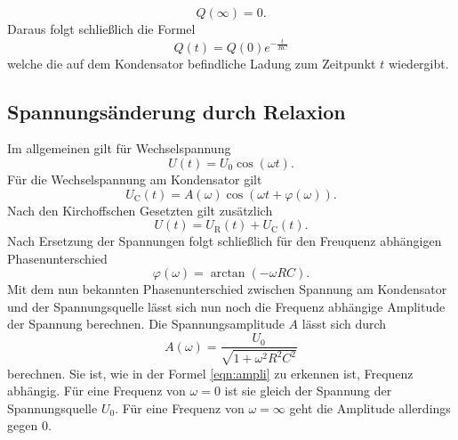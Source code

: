 \begin{equation*}
    Q(\infty) = 0.
\end{equation*}
Daraus folgt schließlich die Formel
\begin{equation}
    Q(t) = Q(0) e^{-\frac{t}{RC}}
    \label{eqn:ladungkondi}
\end{equation}
welche die auf dem Kondensator befindliche Ladung zum Zeitpunkt $t$ wiedergibt.

\subsection{Spannungsänderung durch Relaxion}
Im allgemeinen gilt für Wechselspannung 
\begin{equation}
    U(t) = U_0 \cos(\omega t).
\end{equation}
Für die Wechselspannung am Kondensator gilt 
\begin{equation}
    U_\text{C}(t) = A(\omega) \cos(\omega t + \varphi(\omega)).
\end{equation}
Nach den Kirchoffschen Gesetzten gilt zusätzlich
\begin{equation}
    U(t) = U_\text{R}(t) + U_\text{C}(t).
\end{equation}
Nach Ersetzung der Spannungen folgt schließlich für den Freuquenz abhängigen Phasenunterschied
\begin{equation}
    \varphi(\omega) = \arctan(-\omega RC).
    \label{eqn:phase}
\end{equation}
Mit dem nun bekannten Phasenunterschied zwischen Spannung am Kondensator und der Spannungsquelle lässt sich nun noch die Frequenz abhängige Amplitude der Spannung berechnen.
Die Spannungsamplitude $A$ lässt sich durch 
\begin{equation}
    A(\omega) = \frac{U_0}{\sqrt{1+\omega^2 R^2 C^2}}
    \label{eqn:ampli}
\end{equation}
berechnen.
Sie ist, wie in der Formel \ref{eqn:ampli} zu erkennen ist, Frequenz abhängig.
Für eine Frequenz von $\omega = 0$ ist sie gleich der Spannung der Spannungsquelle $U_0$.
Für eine Frequenz von $\omega = \infty$ geht die Amplitude allerdings gegen 0.

